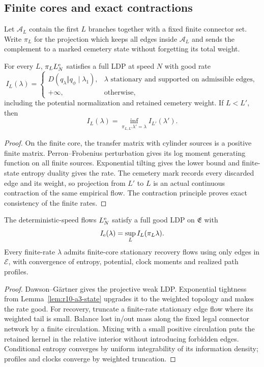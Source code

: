 \subsection{Finite cores and exact contractions}

Let \(\mathcal A_L\) contain the first \(L\) branches together with a fixed
finite connector set.  Write \(\pi_L\) for the projection which keeps all
edges inside \(\mathcal A_L\) and sends the complement to a marked cemetery
state without forgetting its total weight.

\begin{theorem}
\label{thm:r10-a3-finite}
For every \(L\), \(\pi_LL_N^{\rm e}\) satisfies a full LDP at speed \(N\)
with good rate
\[
 I_L(\lambda)=
 \begin{cases}
 D(q_\lambda\Vert q_\phi\mid\lambda_1),&
 \lambda\text{ stationary and supported on admissible edges},\\
 +\infty,&\text{otherwise},
 \end{cases}
\]
including the potential normalization and retained cemetery weight.  If
\(L<L'\), then
\[
 I_L(\lambda)=\inf_{\pi_{L,L'}\lambda'=\lambda}I_{L'}(\lambda').
\]
\end{theorem}

\begin{proof}
On the finite core, the transfer matrix with cylinder sources is a positive
finite matrix.  Perron--Frobenius perturbation gives its log moment generating
function on all finite sources.  Exponential tilting gives the lower bound and
finite-state entropy duality gives the rate.  The cemetery mark records every
discarded edge and its weight, so projection from \(L'\) to \(L\) is an
actual continuous contraction of the same empirical flow.  The contraction
principle proves exact consistency of the finite rates.
\end{proof}

\begin{theorem}
\label{thm:r10-a3-projective}
The deterministic-speed flows \(L_N^{\rm e}\) satisfy a full good LDP on
\(\mathfrak E\) with
\[
 I_{\rm e}(\lambda)=\sup_L I_L(\pi_L\lambda).
\]
Every finite-rate \(\lambda\) admits finite-core stationary recovery flows
using only edges in \(\mathcal E\), with convergence of entropy, potential,
clock moments and realized path profiles.
\end{theorem}

\begin{proof}
Dawson--G\"artner gives the projective weak LDP.  Exponential tightness from
Lemma~\ref{lem:r10-a3-state} upgrades it to the weighted topology and makes the
rate good.  For recovery, truncate a finite-rate stationary edge flow where
its weighted tail is small.  Balance lost in/out mass along the fixed legal
connector network by a finite circulation.  Mixing with a small positive
circulation puts the retained kernel in the relative interior without
introducing forbidden edges.  Conditional entropy converges by uniform
integrability of its information density; profiles and clocks converge by
weighted truncation.
\end{proof}


